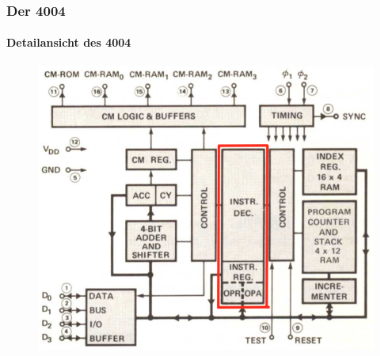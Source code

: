 \begin{frame}
	\frametitle{Der 4004}
	\framesubtitle{Detailansicht des 4004}
	\begin{figure}[ht]
		\includegraphics[width=0.7\linewidth]{images/layout_4004_4.png}
	\end{figure}
\end{frame}


